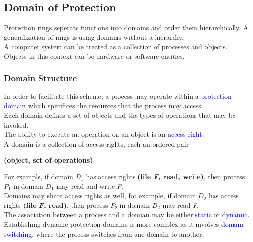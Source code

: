 \documentclass[oneside]{book}
\begin{document}
            \subsection{Domain of Protection}
                Protection rings seperate functions into domains and order them hierarchically. A generalization of rings is using 
                domains without a hierarchy.\\
                A computer system can be treated as a collection of processes and objects.\\
                Objects in this context can be hardware or software entities.\\
                \subsubsection{Domain Structure}
                    In order to facilitate this scheme, a process may operate within a \textcolor{blue}{protection domain} which 
                    specifices the resources that the process may access.\\
                    Each domain defines a set of objects and the types of operations that may be invoked.\\
                    The ability to execute an operation on an object is an \textcolor{blue}{access right}.\\
                    A domain is a collection of access rights, each an ordered pair
                    \begin{center}
                        \textbf{(object, set of operations)}
                    \end{center}
                    For example, if domain $D_1$ has access rights \textbf{(file \textit{F}, read, write)}, then process $P_1$ in domain $D_1$
                    may read and write \textit{F}.\\
                    Domains may share access rights as well, for example, if domain $D_2$ has access rights \textbf{(file \textit{F}, read)},
                    then process $P_2$ in domain $D_2$ may read \textit{F}.\\ 
                    The association between a process and a domian may be either \textcolor{blue}{static} or \textcolor{blue}{dynamic}.\\
                    Establishing dynamic protection domains is more complex as it involves \textcolor{blue}{domain switching}, where 
                    the process switches from one domain to another.\\
\end{document}
